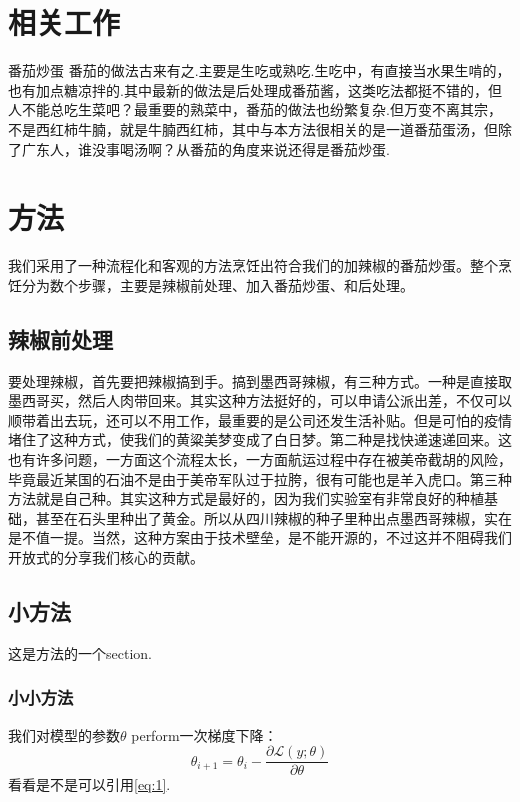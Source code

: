 \clearpage
\section{相关工作}
番茄炒蛋 番茄的做法古来有之.主要是生吃或熟吃.生吃中，有直接当水果生啃的\cite{example2022}，也有加点糖凉拌的\cite{example2022}.其中最新的做法是后处理成番茄酱\cite{example2022}，这类吃法都挺不错的，但人不能总吃生菜吧？最重要的熟菜中，番茄的做法也纷繁复杂.但万变不离其宗，不是西红柿牛腩，就是牛腩西红柿，其中与本方法很相关的是一道番茄蛋汤，但除了广东人，谁没事喝汤啊？从番茄的角度来说还得是番茄炒蛋.

\clearpage
\section{方法}
我们采用了一种流程化和客观的方法烹饪出符合我们的加辣椒的番茄炒蛋。整个烹饪分为数个步骤，主要是辣椒前处理、加入番茄炒蛋、和后处理。

\subsection{辣椒前处理}
要处理辣椒，首先要把辣椒搞到手。搞到墨西哥辣椒，有三种方式。一种是直接取墨西哥买，然后人肉带回来。其实这种方法挺好的，可以申请公派出差，不仅可以顺带着出去玩，还可以不用工作，最重要的是公司还发生活补贴。但是可怕的疫情堵住了这种方式，使我们的黄粱美梦变成了白日梦。第二种是找快递速递回来。这也有许多问题，一方面这个流程太长，一方面航运过程中存在被美帝截胡的风险，毕竟最近某国的石油不是由于美帝军队过于拉胯，很有可能也是羊入虎口。第三种方法就是自己种。其实这种方式是最好的，因为我们实验室有非常良好的种植基础，甚至在石头里种出了黄金。所以从四川辣椒的种子里种出点墨西哥辣椒，实在是不值一提。当然，这种方案由于技术壁垒，是不能开源的，不过这并不阻碍我们开放式的分享我们核心的贡献。

\subsection{小方法}
这是方法的一个section.
\subsubsection{小小方法}


我们对模型的参数$\theta$ perform一次梯度下降：
\begin{equation}
\label{eq:1}
    \theta_{i+1}=\theta_{i}-\frac{\partial \mathcal{L}(y;\theta)}{\partial \theta}
\end{equation}
看看是不是可以引用\cref{eq:1}.


